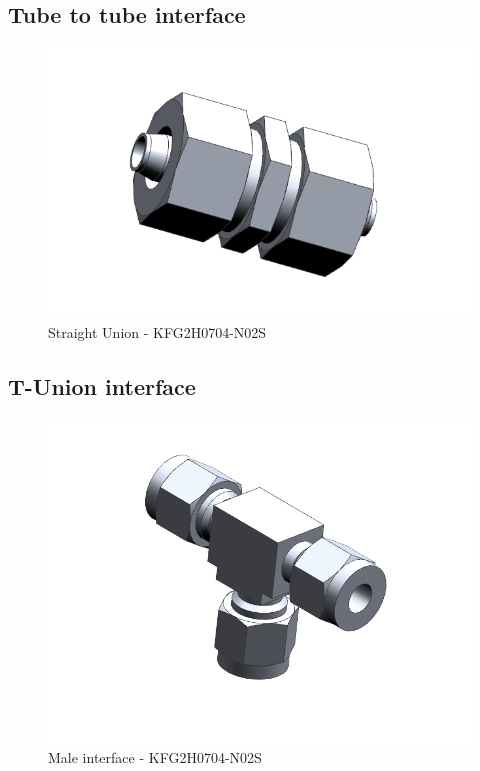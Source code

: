 \subsection{Tube to tube interface}


\begin{figure}[H]
    \centering
    \includegraphics[width=1\textwidth]{appendix/img/interfaces/Interface_Tube_Tube.png}
    \caption{Straight Union - KFG2H0704-N02S}
    \label{fig:STRAIGHT_interface}
\end{figure}


\subsection{T-Union interface}


\begin{figure}[H]
    \centering
    \includegraphics[width=1\textwidth]{appendix/img/interfaces/Interface_T_Union.png}
    \caption{Male interface - KFG2H0704-N02S}
    \label{fig:T_interface}
\end{figure}




\newpage